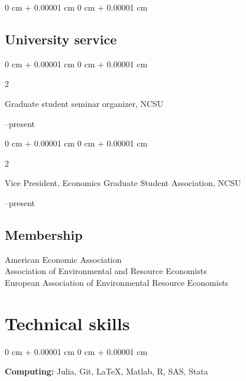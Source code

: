 \documentclass[12pt]{article}
\newenvironment{onecolentry}{
	\begin{adjustwidth}{
			0 cm + 0.00001 cm
		}{
			0 cm + 0.00001 cm
		}
	}
	{
	\end{adjustwidth}
} %
\newenvironment{paper}{
	\begin{onecolentry}
	\begin{hangingpar}
}{
	\end{hangingpar}
	\end{onecolentry}
	\smallskip
} %
\newenvironment{twocolentry}[2][]{
	\onecolentry
	\def\secondColumn{#2}
	\setcolumnwidth{\fill, 4.5 cm}
	\begin{paracol}{2}
	}{
		\switchcolumn \raggedleft \secondColumn
	\end{paracol}
	\endonecolentry
} %
\begin{document}
\begin{paper}
\subsection{University service}

\begin{twocolentry}{2025--present}
	Graduate student seminar organizer, NCSU
\end{twocolentry}
\begin{twocolentry}{2024--present}
	Vice President, Economics Graduate Student Association, NCSU
\end{twocolentry}

\subsection{Membership}

American Economic Association \\
Association of Environmental and Resource Economists \\
European Association of Environmental Resource Economists


\section{Technical skills}

\begin{onecolentry}
	\textbf{Computing:} Julia, Git, \LaTeX, Matlab, R, SAS, Stata
\end{onecolentry}




\end{paper}
\end{document}
